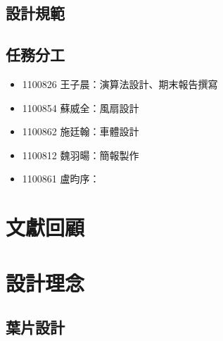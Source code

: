 \documentclass[12pt]{article}       %
\begin{document}

\subsection{設計規範} 
\hspace{2em}


\subsection{任務分工} 


\begin{itemize}
    \item 1100826 王子晨：演算法設計、期末報告撰寫
    \item 1100854 蘇威全：風扇設計
    \item 1100862 施廷翰：車體設計
    \item 1100812 魏羽暘：簡報製作
    \item 1100861 盧昀序：
\end{itemize}


\section{\centering 文獻回顧}
\hspace{2em}


\section{\centering 設計理念}

\subsection{葉片設計} 
\hspace{2em}

\end{document}
